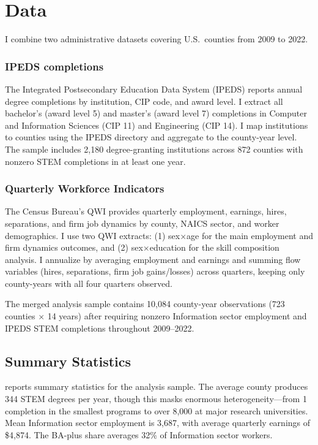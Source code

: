 \documentclass[12pt]{article}
\begin{document}
\section{Data}

I combine two administrative datasets covering U.S.\ counties from 2009 to 2022.

\subsubsection*{IPEDS completions} The Integrated Postsecondary Education Data System (IPEDS) reports annual degree completions by institution, CIP code, and award level. I extract all bachelor's (award level 5) and master's (award level 7) completions in Computer and Information Sciences (CIP 11) and Engineering (CIP 14). I map institutions to counties using the IPEDS directory and aggregate to the county-year level. The sample includes 2,180 degree-granting institutions across 872 counties with nonzero STEM completions in at least one year.

\subsubsection*{Quarterly Workforce Indicators} The Census Bureau's QWI provides quarterly employment, earnings, hires, separations, and firm job dynamics by county, NAICS sector, and worker demographics. I use two QWI extracts: (1) sex$\times$age for the main employment and firm dynamics outcomes, and (2) sex$\times$education for the skill composition analysis. I annualize by averaging employment and earnings and summing flow variables (hires, separations, firm job gains/losses) across quarters, keeping only county-years with all four quarters observed.

The merged analysis sample contains 10,084 county-year observations (723 counties $\times$ 14 years) after requiring nonzero Information sector employment and IPEDS STEM completions throughout 2009--2022.

\subsection{Summary Statistics}



 reports summary statistics for the analysis sample. The average county produces 344 STEM degrees per year, though this masks enormous heterogeneity---from 1 completion in the smallest programs to over 8,000 at major research universities. Mean Information sector employment is 3,687, with average quarterly earnings of \$4,874. The BA-plus share averages 32\% of Information sector workers.
\end{document}
